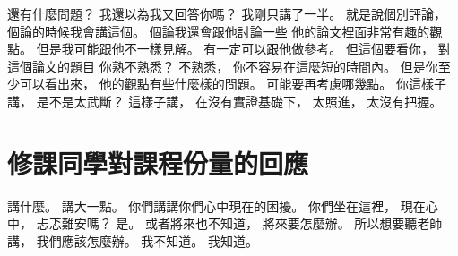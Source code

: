 \hypertarget{w01:cue:3197}{}還有什麼問題？
\hypertarget{w01:cue:3198}{}我還以為我又回答你嗎？
\hypertarget{w01:cue:3199}{}我剛只講了一半。
\hypertarget{w01:cue:3200}{}就是說個別評論，
\hypertarget{w01:cue:3201}{}個論的時候我會講這個。
\hypertarget{w01:cue:3202}{}個論我還會跟他討論一些
\hypertarget{w01:cue:3203}{}他的論文裡面非常有趣的觀點。
\hypertarget{w01:cue:3204}{}但是我可能跟他不一樣見解。
\hypertarget{w01:cue:3205}{}有一定可以跟他做參考。
\hypertarget{w01:cue:3206}{}但這個要看你，
\hypertarget{w01:cue:3207}{}對這個論文的題目
\hypertarget{w01:cue:3208}{}你熟不熟悉？
\hypertarget{w01:cue:3209}{}不熟悉，
\hypertarget{w01:cue:3210}{}你不容易在這麼短的時間內。
\hypertarget{w01:cue:3211}{}但是你至少可以看出來，
\hypertarget{w01:cue:3212}{}他的觀點有些什麼樣的問題。
\hypertarget{w01:cue:3213}{}可能要再考慮哪幾點。
\hypertarget{w01:cue:3214}{}你這樣子講，
\hypertarget{w01:cue:3215}{}是不是太武斷？
\hypertarget{w01:cue:3216}{}這樣子講，
\hypertarget{w01:cue:3217}{}在沒有實證基礎下，
\hypertarget{w01:cue:3218}{}太照進，
\hypertarget{w01:cue:3219}{}太沒有把握。

\section{修課同學對課程份量的回應}

\hypertarget{w01:cue:3220}{}講什麼。
\hypertarget{w01:cue:3221}{}講大一點。
\hypertarget{w01:cue:3222}{}你們講講你們心中現在的困擾。
\hypertarget{w01:cue:3223}{}你們坐在這裡，
\hypertarget{w01:cue:3224}{}現在心中，
\hypertarget{w01:cue:3225}{}忐忑難安嗎？
\hypertarget{w01:cue:3226}{}是。
\hypertarget{w01:cue:3227}{}或者將來也不知道，
\hypertarget{w01:cue:3228}{}將來要怎麼辦。
\hypertarget{w01:cue:3229}{}所以想要聽老師講，
\hypertarget{w01:cue:3230}{}我們應該怎麼辦。
\hypertarget{w01:cue:3231}{}我不知道。
\hypertarget{w01:cue:3232}{}我知道。

